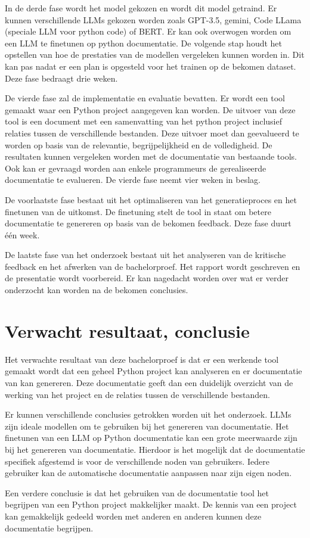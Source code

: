 In de derde fase wordt het model gekozen en wordt dit model getraind. Er kunnen verschillende LLMs gekozen worden zoals GPT-3.5, gemini, Code LLama (speciale LLM voor python code) of BERT.
Er kan ook overwogen worden om een LLM te finetunen op python documentatie.
De volgende stap houdt het opstellen van hoe de prestaties van de modellen vergeleken kunnen worden in. 
Dit kan pas nadat er een plan is opgesteld voor het trainen op de bekomen dataset.
Deze fase bedraagt drie weken.

De vierde fase zal de implementatie en evaluatie bevatten.
Er wordt een tool gemaakt waar een Python project aangegeven kan worden. 
De uitvoer van deze tool is een document met een samenvatting van het python project inclusief relaties tussen de verschillende bestanden.
Deze uitvoer moet dan geevalueerd te worden op basis van de relevantie, begrijpelijkheid en de volledigheid. 
De resultaten kunnen vergeleken worden met de documentatie van bestaande tools.
Ook kan er gevraagd worden aan enkele programmeurs de gerealiseerde documentatie te evalueren.
De vierde fase neemt vier weken in beslag.

De voorlaatste fase bestaat uit het optimaliseren van het generatieproces en het finetunen van de uitkomst.
De finetuning stelt de tool in staat om betere documentatie te genereren op basis van de bekomen feedback.
Deze fase duurt één week.

De laatste fase van het onderzoek bestaat uit het analyseren van de kritische feedback en het afwerken van de bachelorproef.
Het rapport wordt geschreven en de presentatie wordt voorbereid. 
Er kan nagedacht worden over wat er verder onderzocht kan worden na de bekomen conclusies.

\section{Verwacht resultaat, conclusie}%
\label{sec:verwachte_resultaten}

Het verwachte resultaat van deze bachelorproef is dat er een werkende tool gemaakt wordt dat een geheel Python project kan analyseren en er documentatie van kan genereren.
Deze documentatie geeft dan een duidelijk overzicht van de werking van het project en de relaties tussen de verschillende bestanden.

Er kunnen verschillende conclusies getrokken worden uit het onderzoek. 
LLMs zijn ideale modellen om te gebruiken bij het genereren van documentatie.
Het finetunen van een LLM op Python documentatie kan een grote meerwaarde zijn bij het genereren van documentatie.
Hierdoor is het mogelijk dat de documentatie specifiek afgestemd is voor de verschillende noden van gebruikers. Iedere gebruiker kan de automatische documentatie aanpassen naar zijn eigen noden.

Een verdere conclusie is dat het gebruiken van de documentatie tool het begrijpen van een Python project makkelijker maakt.
De kennis van een project kan gemakkelijk gedeeld worden met anderen en anderen kunnen deze documentatie begrijpen.